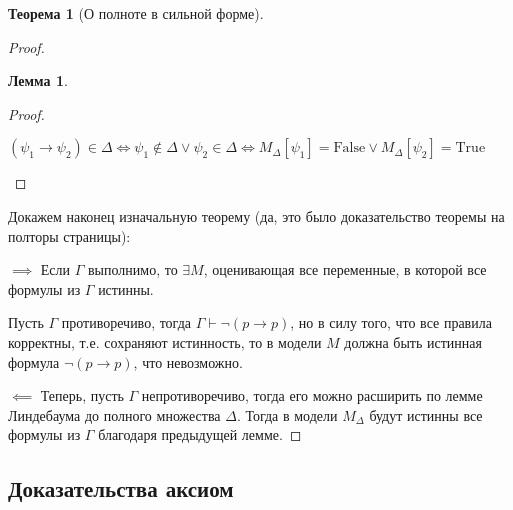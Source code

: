 \documentclass[12pt]{article}
\let\im\rightarrow
\let\n\neg
\let\nin\notin
\theoremstyle{definition}
\newtheorem{theorem}{Теорема}[section]
\theoremstyle{statement}
\theoremstyle{theorem}
\newtheorem{lemma}{Лемма}[section]
\begin{document}
\begin{theorem}[О полноте в сильной форме]
\begin{proof}
\begin{lemma}
\begin{proof}
\begin{itemize}
            $(\psi_1 \im \psi_2) \in \Delta \iff \psi_1 \nin \Delta \lor
            \psi_2 \in \Delta \iff M_\Delta[\psi_1] = \mathrm{False} \lor
            M_\Delta[\psi_2] = \mathrm{True}$
        \end{itemize}
      \end{proof}
    \end{lemma}

    Докажем наконец изначальную теорему (да, это было доказательство
    теоремы на полторы страницы):

    $\implies$ Если $\Gamma$ выполнимо, то $\exists M$, оценивающая все
    переменные, в которой все формулы из $\Gamma$ истинны.

    Пусть $\Gamma$ противоречиво, тогда $\Gamma \vdash \n (p \im p)$,
    но в силу того, что все правила корректны, т.е. сохраняют
    истинность, то в модели $M$ должна быть истинная формула $\n(p \im
    p)$, что невозможно.

    $\impliedby$ Теперь, пусть $\Gamma$ непротиворечиво, тогда его
    можно расширить по лемме Линдебаума до полного множества $\Delta$.
    Тогда в модели $M_\Delta$ будут истинны все формулы из $\Gamma$
    благодаря предыдущей лемме.
  \end{proof}
\end{theorem}

\subsection{Доказательства аксиом}
\end{document}

